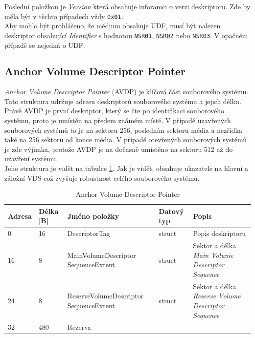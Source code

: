 Poslední položkou je \textit{Version} která obsahuje inforamci o verzi deskriptoru. Zde by měla být v těchto případech vždy \texttt{0x01}.\\
Aby mohlo být prohlášeno, že médium obsahuje UDF, musí být nalezen deskriptor obsahující \textit{Identifier} s hodnotou \texttt{NSR01}, \texttt{NSR02} nebo \texttt{NSR03}. V opačném případě se nejedná o UDF.

\subsection{Anchor Volume Descriptor Pointer}
\label{sec:avdp}
\textit{Anchor Volume Descriptor Pointer} (AVDP) je klíčová část souborového systému. Tato struktura udržuje adresu deskriptorů souborového systému a jejich délku. Právě AVDP je první deskriptor, který se čte po identifikaci souborového systému, proto je umístěn na předem známém místě. V případě uzavřených souborových systémů to je na sektoru 256, posledním sektoru média a nezřídka také na 256 sektoru od konce média. V případě otevřených souborových systémů je zde výjimka, protože AVDP je na dočasně umístěno na sektoru 512 až do uzavření systému.\\
Jeho struktura je vidět na tabulce \ref{tab-avdp}. Jak je vidět, obsahuje ukazatele na hlavní a záložní VDS což zvyšuje robustnost celého souborového systému.
\begin{table}[hb]
    \begin{tabular}{ | l | l | p{4.5cm} | p{1.3cm} | p{5.5cm} | }
        \hline
        Adresa  & Délka [B]   & Jméno položky & Datový typ    & Popis \\ \hline
        0       & 16          & DescriptorTag & struct        & Popis deskriptoru \\ \hline
        16      & 8           & MainVolumeDescriptor SequenceExtent & struct & Sektor a délka \textit{Main Volume Descriptor Sequence} \\ \hline
        24      & 8           & ReserveVolumeDescriptor SequenceExtent & struct & Sektor a délka \textit{Reserve Volume Descriptor Sequence} \\ \hline
        32      & 480         & Rezerva & & \\ \hline
    \end{tabular}
    \caption{Anchor Volume Descriptor Pointer\label{tab-avdp}}
\end{table}

